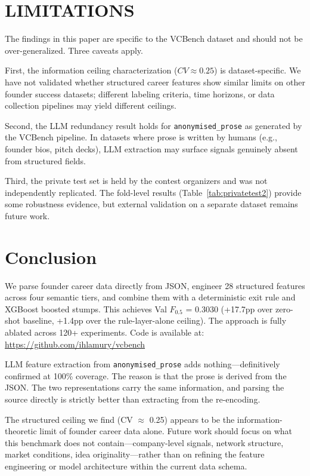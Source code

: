 \documentclass[10pt, conference]{IEEEtran}
\begin{document}
\section{LIMITATIONS}

The findings in this paper are specific to the VCBench dataset and should not be over-generalized. Three caveats apply.

First, the information ceiling characterization ($CV \approx 0.25$) is dataset-specific. We have not validated whether structured career features show similar limits on other founder success datasets; different labeling criteria, time horizons, or data collection pipelines may yield different ceilings.

Second, the LLM redundancy result holds for \texttt{anonymised\_prose} as generated by the VCBench pipeline. In datasets where prose is written by humans (e.g., founder bios, pitch decks), LLM extraction may surface signals genuinely absent from structured fields.

Third, the private test set is held by the contest organizers and was not independently replicated. The fold-level results (Table~\ref{tab:privatetest2}) provide some robustness evidence, but external validation on a separate dataset remains future work.

\section{Conclusion}

We parse founder career data directly from JSON, engineer 28 structured features across four semantic tiers, and combine them with a deterministic exit rule and XGBoost boosted stumps. This achieves Val $F_{0.5}$ = 0.3030 (+17.7pp over zero-shot baseline, +1.4pp over the rule-layer-alone ceiling). The approach is fully ablated across 120+ experiments. Code is available at: \url{https://github.com/ihlamury/vcbench}

LLM feature extraction from \texttt{anonymised\_prose} adds nothing---definitively confirmed at 100\% coverage. The reason is that the prose is derived from the JSON. The two representations carry the same information, and parsing the source directly is strictly better than extracting from the re-encoding.

The structured ceiling we find (CV $\approx$ 0.25) appears to be the information-theoretic limit of founder career data alone. Future work should focus on what this benchmark does not contain---company-level signals, network structure, market conditions, idea originality---rather than on refining the feature engineering or model architecture within the current data schema.
\end{document}
